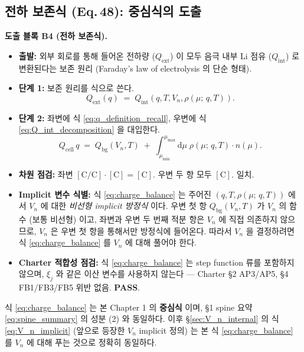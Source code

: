 \documentclass[11pt,a4paper]{article}
\newcommand{\dd}{\mathrm{d}}
\newcommand{\bg}{\mathrm{bg}}
\newcommand{\cell}{\mathrm{cell}}
\newcommand{\ext}{\mathrm{ext}}
\newcommand{\Cunit}{\mathrm{C}}
\newcommand{\mucont}{\mu}
\newcommand{\rhomu}{\rho(\mucont;\, q, T)}
\newcommand{\nmu}{n(\mucont)}
\begin{document}
\subsection{전하 보존식 (Eq.\,48): 중심식의 도출}
\label{sec:central_equation}

\textbf{도출 블록 B4 (전하 보존식).}

\begin{itemize}
\item \textbf{출발:} 외부 회로를 통해 들어온 전하량 ($Q_{\ext}$) 이 모두 음극 내부
      Li 점유 ($Q_{\mathrm{int}}$) 로 변환된다는 보존 원리 (Faraday's law of
      electrolysis 의 단순 형태).
\item \textbf{단계 1:} 보존 원리를 식으로 쓴다.
      \begin{equation}
      Q_{\ext}(q) \;=\; Q_{\mathrm{int}}(q, T, V_n, \rhomu).
      \label{eq:conservation_raw}
      \end{equation}
\item \textbf{단계 2:} 좌변에 식 \eqref{eq:q_definition_recall}, 우변에 식
      \eqref{eq:Q_int_decomposition} 을 대입한다.
      \begin{equation}
      \boxed{
      Q_{\cell}\, q
      \;=\;
      Q_{\bg}(V_n, T)
      \;+\;
      \int_{\mucont_{\min}}^{\mucont_{\max}} \dd\mucont\;
      \rhomu \cdot \nmu .
      }
      \label{eq:charge_balance}
      \end{equation}
\item \textbf{차원 점검:} 좌변 $[\Cunit / \Cunit] \cdot [\Cunit] = [\Cunit]$.
      우변 두 항 모두 $[\Cunit]$. 일치.
\item \textbf{Implicit 변수 식별:} 식 \eqref{eq:charge_balance} 는 주어진 $(q, T,
      \rhomu)$ 에서 $V_n$ 에 대한 \emph{비선형 implicit 방정식} 이다. 우변 첫 항
      $Q_{\bg}(V_n, T)$ 가 $V_n$ 의 함수 (보통 비선형) 이고, 좌변과 우변 두 번째
      적분 항은 $V_n$ 에 직접 의존하지 않으므로, $V_n$ 은 우변 첫 항을 통해서만
      방정식에 들어온다. 따라서 $V_n$ 을 결정하려면 식 \eqref{eq:charge_balance}
      를 $V_n$ 에 대해 풀어야 한다.
\item \textbf{Charter 적합성 점검:} 식 \eqref{eq:charge_balance} 는 step function
      류를 포함하지 않으며, $\xi_j$ 와 같은 이산 변수를 사용하지 않는다 — Charter
      \S 2 AP3/AP5, \S 4 FB1/FB3/FB5 위반 없음. \textbf{PASS}.
\end{itemize}

식 \eqref{eq:charge_balance} 는 본 Chapter 1 의 \textbf{중심식} 이며, \S 1 spine
요약 \eqref{eq:spine_summary} 의 성분 (2) 와 동일하다. 이후 \S\ref{sec:V_n_internal}
의 식 \eqref{eq:V_n_implicit} (앞으로 등장한 $V_n$ implicit 정의) 는 본 식
\eqref{eq:charge_balance} 를 $V_n$ 에 대해 푸는 것으로 정확히 동일하다.
\end{document}
